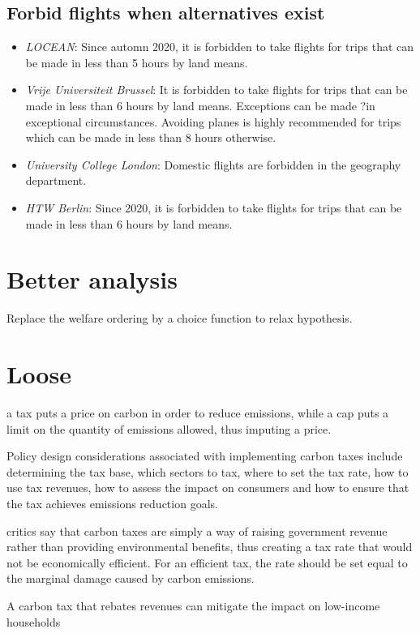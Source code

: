 \documentclass[version=3.21, pagesize, twoside=off, bibliography=totoc, DIV=calc, fontsize=12pt, a4paper, french, english]{scrartcl}
\begin{document}
\subsection{Forbid flights when alternatives exist}
\begin{itemize}
\item \emph{LOCEAN}: Since automn 2020, it is forbidden to take flights for trips that can be made in less than 5 hours by land means. 
\item \emph{Vrije Universiteit Brussel}: It is forbidden to take flights for trips that can be made in less than 6 hours by land means. Exceptions can be made ?in exceptional circumstances. Avoiding planes is highly recommended for trips which can be made in less than 8 hours otherwise. 
\item \emph{University College London}: Domestic flights are forbidden in the geography department. 
\item \emph{HTW Berlin}: Since 2020, it is forbidden to take flights for trips that can be made in less than 6 hours by land means.
\end{itemize}

\section{Better analysis}
Replace the welfare ordering by a choice function to relax hypothesis.

\section{Loose}
a tax puts a price on carbon in order to reduce emissions, while a cap puts a limit on the quantity of emissions allowed, thus imputing a price.

Policy design considerations associated with implementing carbon taxes
include determining the tax base, which sectors to tax, where to set the tax rate, how to use tax
revenues, how to assess the impact on consumers and how to ensure that the tax achieves emissions
reduction goals.

critics say that carbon taxes are simply a way of raising government
revenue rather than providing environmental benefits, thus creating a tax rate that would not be economically efficient. For an efficient tax, the rate should be set equal to the marginal damage caused by
carbon emissions.

A carbon tax that rebates revenues can mitigate the impact on low-income households
\end{document}
